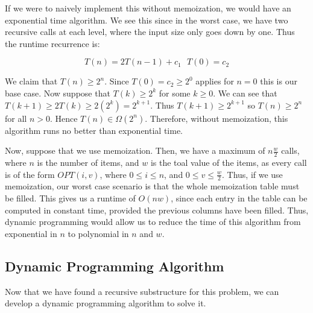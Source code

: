 \documentclass{article}
\begin{document}
If we were to naively implement this without memoization, we would have an exponential time algorithm.  We see this since in the worst case, we have two recursive calls at each level, where the input size only goes down by one.  Thus the runtime recurrence is:

\[T(n) = 2T(n-1) + c_1 ~~~ T(0) = c_2 \]

We claim that $T(n) \geq 2^{n}$. Since $T(0) = c_2 \geq 2^0$ applies for $n=0$ this is our base case.  Now suppose that $T(k) \geq 2^k$ for some $k \geq 0$.  We can see that  $T(k+1) \geq 2T(k) \geq 2(2^{k}) = 2^{k+1} $. Thus $T(k+1) \geq 2^{k+1}$ so $T(n) \geq 2^n$ for all $n > 0$. Hence $T(n) \in \Omega(2^n)$. Therefore, without memoization, this algorithm runs no better than exponential time.

Now, suppose that we use memoization.  Then, we have a maximum of $n\frac{w}{2}$ calls, where $n$ is the number of items, and $w$ is the toal value of the items, as every call is of the form $OPT(i,v)$, where $0 \leq i \leq n$, and $0 \leq v \leq \frac{w}{2}$.  Thus, if we use memoization, our worst case scenario is that the whole memoization table must be filled.  This gives us a runtime of $O(nw)$, since each entry in the table can be computed in constant time, provided the previous columns have been filled.  Thus, dynamic programming would allow us to reduce the time of this algorithm from exponential in $n$ to polynomial in $n$ and $w$.

\newpage

\subsection{Dynamic Programming Algorithm}

Now that we have found a recursive substructure for this problem, we can develop a dynamic programming algorithm to solve it.  
\end{document}
